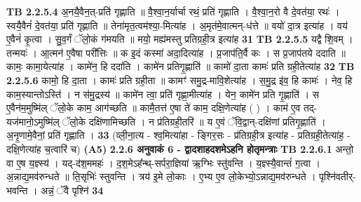\documentclass[17pt]{extarticle}
\begin{document}
                  \newline
                                \textbf{ TB 2.2.5.4} \newline
                  अ॒नयै॒वैन॒त्-प्रति॑ गृह्णाति ॥ वै॒श्वा॒न॒र्यार्चा रथं॒ प्रति॑ गृह्णाति । वै॒श्वा॒न॒रो वै दे॒वत॑या॒ रथः॑ । स्वयै॒वैनं॑ दे॒वत॑या॒ प्रति॑ गृह्णाति ॥ तेना॑मृत॒त्वम॑श्या॒-मित्या॑ह । अ॒मृत॑मे॒वात्मन्-ध॑त्ते ॥ वयो॑ दा॒त्र इत्या॑ह । वय॑ ए॒वैनं॑ कृ॒त्वा । सु॒व॒र्गं ॅलो॒कं ग॑मयति ॥ मयो॒ मह्य॑मस्तु प्रतिग्रही॒त्र इत्या॑ह \textbf{ 31} \newline
                  \newline
                                \textbf{ TB 2.2.5.5} \newline
                  यद्वै शि॒वम् । तन्मयः॑ । आ॒त्मन॑ ए॒वैषा परी᳚त्तिः ॥ क इ॒दं कस्मा॑ अदा॒दित्या॑ह । प्र॒जाप॑ति॒र्वै कः । स प्र॒जाप॑तये ददाति ॥ कामः॒ कामा॒येत्या॑ह । कामे॑न॒ हि ददा॑ति । कामे॑न प्रतिगृ॒ह्णाति॑ ॥ कामो॑ दा॒ता कामः॑ प्रति ग्रही॒तेत्या॑ह \textbf{ 32} \newline
                  \newline
                                \textbf{ TB 2.2.5.6} \newline
                  कामो॒ हि दा॒ता । कामः॑ प्रति ग्रही॒ता ॥ कामꣳ॑ समु॒द्र-मावि॒शेत्या॑ह । स॒मु॒द्र इ॑व॒ हि कामः॑ । नेव॒ हि काम॒स्यान्तोऽस्ति॑ । न स॑मु॒द्रस्य॑ ॥ कामे॑न त्वा॒ प्रति॑ गृह्णा॒मीत्या॑ह । येन॒ कामे॑न प्रति गृ॒ह्णाति॑ । स ए॒वैन॑म॒मुष्मि॑ल् ॅलो॒के काम॒ आग॑च्छति ॥ कामै॒तत्त॑ ए॒षा ते॑ काम॒ दक्षि॒णेत्या॑ह ( ) । काम॑ ए॒व तद्-यज॑मानो॒ऽमुष्मि॑ल् ॅलो॒के दक्षि॑णामिच्छति । न प्र॑तिग्रही॒तरि॑ ॥ य ए॒वं ॅवि॒द्वान्-दक्षि॑णां प्रतिगृ॒ह्णाति॑ । अ॒नृ॒णामे॒वैनां॒ प्रति॑ गृह्णाति । \textbf{ 33} \newline
                  \newline
                                    (व्ली॒ना॒त्य - श्व॒मित्या॑हा - ङ्गिर॒सः - प्र॑तिग्रही॒त्र इत्या॑ह - प्रतिग्रही॒तेत्या॑ह॒ - दक्षि॒णेत्या॑ह च॒त्वारि॑ च) \textbf{(A5)} \newline \newline
                \textbf{ 2.2.6     अनुवाकं   6 - द्वादशाहदशमेऽहनि होतृमन्त्राः} \newline
                                \textbf{ TB 2.2.6.1} \newline
                  अन्तो॒ वा ए॒ष य॒ज्ञ्स्य॑ । यद्-द॑श॒ममहः॑ । द॒श॒मेऽह᳚न्थ्-सर्परा॒ज्ञिया॑ ऋ॒ग्भिः स्तु॑वन्ति । य॒ज्ञ्स्यै॒वान्तं॑ ग॒त्वा । अ॒न्नाद्य॒मव॑रुन्धते ॥ ति॒सृभिः॑ स्तुवन्ति । त्रय॑ इ॒मे लो॒काः । ए॒भ्य ए॒व लो॒केभ्यो॒ऽन्नाद्य॒मव॑रुन्धते । पृश्नि॑वतीर्-भवन्ति । अन्नं॒ ॅवै पृश्नि॑ \textbf{ 34} \newline
\end{document}

